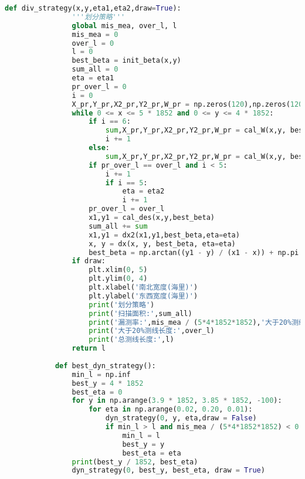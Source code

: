 \documentclass[withoutpreface,bwprint]{cumcmthesis} %
\begin{document}
\begin{appendices}
\begin{lstlisting}[language=python]
            def div_strategy(x,y,eta1,eta2,draw=True):
                '''划分策略'''
                global mis_mea, over_l, l
                mis_mea = 0
                over_l = 0
                l = 0
                best_beta = init_beta(x,y)
                sum_all = 0
                eta = eta1
                pr_over_l = 0
                i = 0
                X_pr,Y_pr,X2_pr,Y2_pr,W_pr = np.zeros(120),np.zeros(120),np.zeros(120),np.zeros(120),np.zeros(120)
                while 0 <= x <= 5 * 1852 and 0 <= y <= 4 * 1852:
                    if i == 6:
                        sum,X_pr,Y_pr,X2_pr,Y2_pr,W_pr = cal_W(x,y, best_beta,X_pr,Y_pr,X2_pr,Y2_pr,W_pr,draw=draw,color = 'blue')
                        i += 1
                    else:
                        sum,X_pr,Y_pr,X2_pr,Y2_pr,W_pr = cal_W(x,y, best_beta,X_pr,Y_pr,X2_pr,Y2_pr,W_pr,draw=draw)
                    if pr_over_l == over_l and i < 5:
                        i += 1
                        if i == 5:
                            eta = eta2
                            i += 1
                    pr_over_l = over_l
                    x1,y1 = cal_des(x,y,best_beta)
                    sum_all += sum
                    x1,y1 = dx2(x1,y1,best_beta,eta=eta)
                    x, y = dx(x, y, best_beta, eta=eta)
                    best_beta = np.arctan((y1 - y) / (x1 - x)) + np.pi / 2
                if draw:
                    plt.xlim(0, 5)
                    plt.ylim(0, 4)
                    plt.xlabel('南北宽度(海里)')
                    plt.ylabel('东西宽度(海里)')
                    print('划分策略')
                    print('扫描面积:',sum_all)
                    print('漏测率:',mis_mea / (5*4*1852*1852),'大于20%测线长度占比:',over_l / l)
                    print('大于20%测线长度:',over_l)
                    print('总测线长度:',l)
                return l
            
            def best_dyn_strategy():
                min_l = np.inf
                best_y = 4 * 1852
                best_eta = 0
                for y in np.arange(3.9 * 1852, 3.85 * 1852, -100):
                    for eta in np.arange(0.02, 0.20, 0.01):
                        dyn_strategy(0, y, eta,draw = False)
                        if min_l > l and mis_mea / (5*4*1852*1852) < 0.05:
                            min_l = l
                            best_y = y
                            best_eta = eta
                print(best_y / 1852, best_eta)
                dyn_strategy(0, best_y, best_eta, draw = True)
            

\end{lstlisting}
\end{appendices}
\end{document}
